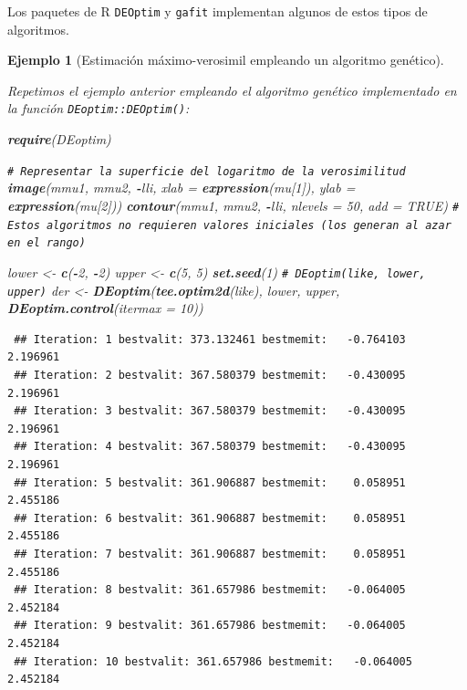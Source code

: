\documentclass[
  spanish,
  10pt,
]{book}
\newenvironment{Shaded}{\begin{snugshade}}{\end{snugshade}}
\newcommand{\AttributeTok}[1]{\textcolor[rgb]{0.13,0.29,0.53}{#1}}
\newcommand{\CommentTok}[1]{\textcolor[rgb]{0.56,0.35,0.01}{\textit{#1}}}
\newcommand{\ConstantTok}[1]{\textcolor[rgb]{0.56,0.35,0.01}{#1}}
\newcommand{\DecValTok}[1]{\textcolor[rgb]{0.00,0.00,0.81}{#1}}
\newcommand{\FunctionTok}[1]{\textcolor[rgb]{0.13,0.29,0.53}{\textbf{#1}}}
\newcommand{\NormalTok}[1]{#1}
\newcommand{\OtherTok}[1]{\textcolor[rgb]{0.56,0.35,0.01}{#1}}
\newcommand{\SpecialCharTok}[1]{\textcolor[rgb]{0.81,0.36,0.00}{\textbf{#1}}}
\theoremstyle{break}
\newtheorem{example}{Ejemplo}[chapter]
\theoremstyle{nonumberplain}
\renewcommand{\CommentTok}[1]{\textcolor[rgb]{0.41,0.41,0.41}{\texttt{#1}}}
\begin{document}
Los paquetes de R \texttt{DEOptim} y \texttt{gafit} implementan algunos de estos
tipos de algoritmos.

\begin{example}[Estimación máximo-verosimil empleando un algoritmo genético]
\protect\hypertarget{exm:mv-DEoptim}{}\label{exm:mv-DEoptim}

Repetimos el ejemplo anterior empleando el algoritmo genético implementado en la función \texttt{DEoptim::DEOptim()}:

\begin{Shaded}
\begin{Highlighting}[]
\FunctionTok{require}\NormalTok{(DEoptim)}

\CommentTok{\# Representar la superficie del logaritmo de la verosimilitud}
\FunctionTok{image}\NormalTok{(mmu1, mmu2, }\SpecialCharTok{{-}}\NormalTok{lli, }\AttributeTok{xlab =} \FunctionTok{expression}\NormalTok{(mu[}\DecValTok{1}\NormalTok{]), }\AttributeTok{ylab =} \FunctionTok{expression}\NormalTok{(mu[}\DecValTok{2}\NormalTok{]))}
\FunctionTok{contour}\NormalTok{(mmu1, mmu2, }\SpecialCharTok{{-}}\NormalTok{lli, }\AttributeTok{nlevels =} \DecValTok{50}\NormalTok{, }\AttributeTok{add =} \ConstantTok{TRUE}\NormalTok{)}
\CommentTok{\# Estos algoritmos no requieren valores iniciales (los generan al azar en el rango)}

\NormalTok{lower }\OtherTok{\textless{}{-}} \FunctionTok{c}\NormalTok{(}\SpecialCharTok{{-}}\DecValTok{2}\NormalTok{, }\SpecialCharTok{{-}}\DecValTok{2}\NormalTok{)}
\NormalTok{upper }\OtherTok{\textless{}{-}} \FunctionTok{c}\NormalTok{(}\DecValTok{5}\NormalTok{, }\DecValTok{5}\NormalTok{)}
\FunctionTok{set.seed}\NormalTok{(}\DecValTok{1}\NormalTok{)}
\CommentTok{\# DEoptim(like, lower, upper)}
\NormalTok{der }\OtherTok{\textless{}{-}} \FunctionTok{DEoptim}\NormalTok{(}\FunctionTok{tee.optim2d}\NormalTok{(like), lower, upper, }\FunctionTok{DEoptim.control}\NormalTok{(}\AttributeTok{itermax =} \DecValTok{10}\NormalTok{))}
\end{Highlighting}
\end{Shaded}

\begin{verbatim}
 ## Iteration: 1 bestvalit: 373.132461 bestmemit:   -0.764103    2.196961
 ## Iteration: 2 bestvalit: 367.580379 bestmemit:   -0.430095    2.196961
 ## Iteration: 3 bestvalit: 367.580379 bestmemit:   -0.430095    2.196961
 ## Iteration: 4 bestvalit: 367.580379 bestmemit:   -0.430095    2.196961
 ## Iteration: 5 bestvalit: 361.906887 bestmemit:    0.058951    2.455186
 ## Iteration: 6 bestvalit: 361.906887 bestmemit:    0.058951    2.455186
 ## Iteration: 7 bestvalit: 361.906887 bestmemit:    0.058951    2.455186
 ## Iteration: 8 bestvalit: 361.657986 bestmemit:   -0.064005    2.452184
 ## Iteration: 9 bestvalit: 361.657986 bestmemit:   -0.064005    2.452184
 ## Iteration: 10 bestvalit: 361.657986 bestmemit:   -0.064005    2.452184
\end{verbatim}


\end{example}
\end{document}
